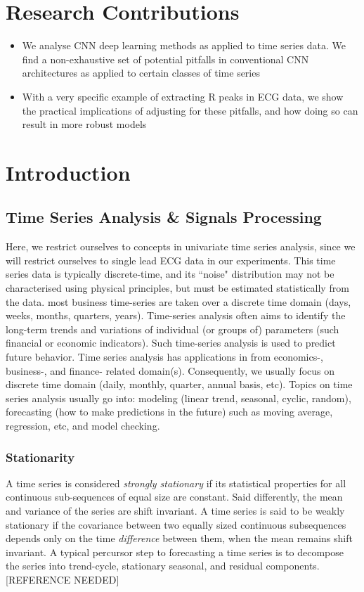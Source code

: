 \documentclass[9pt,conference]{IEEEtran}
\begin{document}
\section{Research Contributions}
\begin{itemize}
    \item We analyse CNN deep learning methods as applied to time series data. We find a non-exhaustive set of potential pitfalls in conventional CNN architectures as applied to certain classes of time series
    \item With a very specific example of extracting R peaks in ECG data, we show the practical implications of adjusting for these pitfalls, and how doing so can result in more robust models  
\end{itemize}
\section{Introduction}

\subsection{Time Series Analysis \& Signals Processing}
Here, we restrict ourselves to concepts in univariate time series analysis, since we will restrict ourselves to single lead ECG data in our experiments. This time series data is typically discrete-time, and its ``noise" distribution may not be characterised using physical principles, but must be estimated statistically from the data. most business time-series are taken over a discrete time domain (days, weeks, months, quarters, years). Time-series analysis often aims to identify the long-term trends and variations of individual (or groups of) parameters (such financial or economic indicators). Such time-series analysis is used to predict future behavior. Time series analysis  has applications in from economics-, business-, and finance- related domain(s). Consequently, we usually focus on discrete time domain (daily, monthly, quarter, annual basis, etc). Topics on time series analysis usually go into: modeling (linear trend, seasonal, cyclic, random), forecasting (how to make predictions in the future) such as moving average, regression, etc, and model checking.


\subsubsection{Stationarity}
A time series is considered  \textit{strongly stationary} if its statistical properties for all continuous sub-sequences of equal size are constant. Said differently, the mean and variance of the series are shift invariant. A time series is said to be weakly stationary if the covariance between two equally sized continuous subsequences depends only on the time \textit{difference} between them, when the mean remains shift invariant. A typical percursor step to forecasting a time series is to decompose the series into trend-cycle, stationary seasonal, and residual components. [REFERENCE NEEDED]
\end{document}
